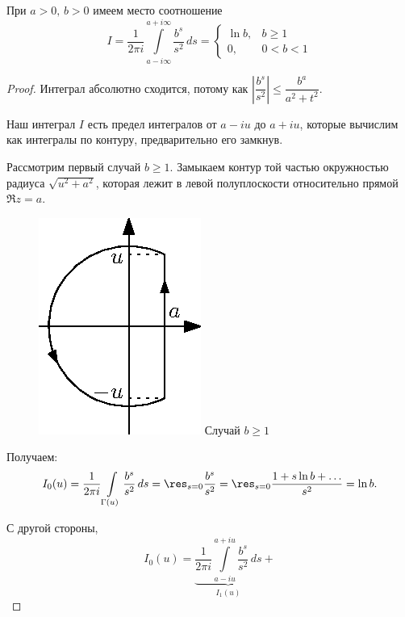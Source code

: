 \begin{lemma} При $a>0,\,b>0$ имеем место соотношение
$$I = \frac{1}{2\pi i}\int\limits_{a - i\infty}^{a + i\infty} \frac{b^s}{s^2}\,ds =
\begin{cases}
\ln b,&b \geqslant 1\\
0,&0<b<1
\end{cases}$$
\label{lemma_for_om_formula}
\end{lemma}
\begin{proof}
Интеграл абсолютно сходится, потому как  $\left|\dfrac{b^s}{s^2}\right| \leqslant \dfrac{b^a}{a^2 + t^2}$.


Наш интеграл $I$ есть предел интегралов от $a-iu$ до $a+iu$, которые вычислим как интегралы по контуру, предварительно его замкнув.\par
{} Рассмотрим первый случай $b\ge1$. Замыкаем контур той частью окружностью радиуса $\sqrt{u^2 + a^2}$, которая лежит в левой полуплоскости относительно прямой $\Re{z}=a$.\par
\begin{figure}
\begin{center}
\vskip -20pt
\includegraphics[scale=1.0]{05012}
Случай $b\ge1$
\end{center}
\end{figure}\par
Получаем:
$$I_0(u)=\frac{1}{2\pi i}\int\limits_{\Gamma(u)} \frac{b^s}{s^2}\,ds = \res_{s = 0}\frac{b^s}{s^2} = \res_{s=0}\frac{1+s\ln b + \ldots}{s^2} = \ln{b}.$$\par
С другой стороны,
$$I_0(u) = \underbrace{\frac{1}{2\pi i}\int\limits_{a - iu}^{a + iu}\frac{b^s}{s^2}\,ds}_{I_1(u)} +
$$
\end{proof}
